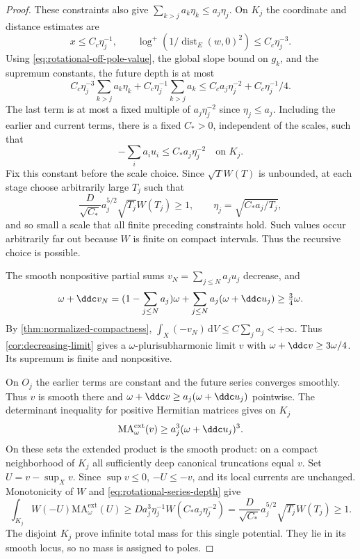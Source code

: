 \begin{proof}
These constraints also give $\sum_{k>j}a_k\eta_k\leq a_j\eta_j$.
On $K_j$ the coordinate and distance estimates are
\[
 x\leq C_c\eta_j^{-1},\qquad
 \log^+(1/\operatorname{dist}_E(w,0)^2)\leq C_c\eta_j^{-3}.
\]
Using \eqref{eq:rotational-off-pole-value}, the global slope bound on $g_k$, and the
supremum constants, the future depth is at most
\[
 C_c\eta_j^{-3}\sum_{k>j}a_k\eta_k
       +C_c\eta_j^{-1}\sum_{k>j}a_k
 \leq C_c a_j\eta_j^{-2}+C_c\eta_j^{-1}/4.
\]
The last term is at most a fixed multiple of $a_j\eta_j^{-2}$ since
$\eta_j\leq a_j$. Including the earlier and current terms, there is a fixed
$C_*>0$, independent of the scales, such that
\begin{equation}\label{eq:rotational-series-depth}
 -\sum_i a_iu_i\leq C_*a_j\eta_j^{-2}\quad\text{on }K_j.
\end{equation}
Fix this constant before the scale choice. Since $\sqrt T W(T)$ is unbounded,
at each stage choose arbitrarily large $T_j$ such that
\[
 \frac D{\sqrt{C_*}}a_j^{5/2}\sqrt{T_j}W(T_j)\geq1,
 \qquad \eta_j=\sqrt{C_*a_j/T_j},
\]
and so small a scale that all finite preceding constraints hold.
Such values occur arbitrarily far out because $W$ is finite on compact
intervals. Thus the recursive choice is possible.

The smooth nonpositive partial sums $v_N=\sum_{j\leq N}a_ju_j$ decrease, and
\[
 \omega+\ddc v_N
 =(1-\sum_{j\leq N}a_j)\omega
       +\sum_{j\leq N}a_j(\omega+\ddc u_j)\geq\tfrac34\omega.
\]
By \cref{thm:normalized-compactness}, $\int_X(-v_N)\,\mathrm dV\leq C\sum_j a_j<+\infty$. Thus \cref{cor:decreasing-limit} gives a $\omega$-plurisubharmonic limit $v$ with $\omega+\ddc v\geq3\omega/4$. Its supremum is finite and nonpositive.

On $O_j$ the earlier terms are constant and the future series converges
smoothly. Thus $v$ is smooth there and
$\omega+\ddc v\geq a_j(\omega+\ddc u_j)$ pointwise.
The determinant inequality for positive Hermitian matrices gives on $K_j$
\[
 \mathrm{MA}^{\mathrm{ext}}_\omega(v)\geq a_j^3(\omega+\ddc u_j)^3.
\]
On these sets the extended product is the smooth product: on a compact neighborhood of $K_j$
all sufficiently deep canonical truncations equal $v$.
Set $U=v-\sup_Xv$. Since $\sup v\leq0$, $-U\leq-v$, and its local currents
are unchanged. Monotonicity of $W$ and \eqref{eq:rotational-series-depth} give
\[
 \int_{K_j}W(-U)\mathrm{MA}^{\mathrm{ext}}_\omega(U)
 \geq D a_j^3\eta_j^{-1}W(C_*a_j\eta_j^{-2})
 =\frac D{\sqrt{C_*}}a_j^{5/2}\sqrt{T_j}W(T_j)\geq1.
\]
The disjoint $K_j$ prove infinite total mass for this single potential.
They lie in its smooth locus, so no mass is assigned to poles.
\end{proof}

